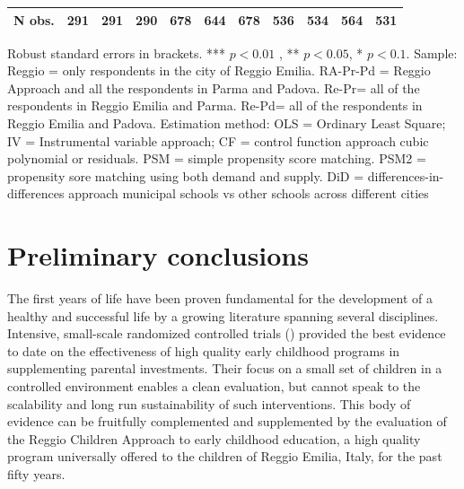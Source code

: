 \documentclass[12pt]{article}
\begin{document}
\begin{table}[ht]
\begin{center}
\begin{adjustbox}{width=1.2\textwidth,center=\textwidth}
\begin{tabular}{l*{10}{c}}
\hline
N obs. &  291 & 291 & 290 & 678 & 644 & 678 & 536 & 534 & 564 & 531 \\
\hline
\end{tabular}
\end{adjustbox}
\end{center}
\par
\vspace{1ex}
\par
{\footnotesize \raggedright{Robust standard errors in brackets. *** $p<0.01$%
, ** $p<0.05$, * $p<0.1$. Sample: Reggio = only respondents in the city of
Reggio Emilia. RA-Pr-Pd = Reggio Approach and all the respondents in Parma
and Padova. Re-Pr= all of the respondents in Reggio Emilia and Parma. Re-Pd=
all of the respondents in Reggio Emilia and Padova. Estimation method: OLS =
Ordinary Least Square; IV = Instrumental variable approach; CF = control
function approach cubic polynomial or residuals. PSM = simple propensity
score matching. PSM2 = propensity sore matching using both demand and
supply. DiD = differences-in-differences approach municipal schools vs other
schools across different cities} }
\end{table}


\section{Preliminary conclusions}

\label{sec:conclusion}

The first years of life have been proven fundamental for the development of
a healthy and successful life by a growing literature spanning several
disciplines. Intensive, small-scale randomized controlled trials (\cite%
{Heckman2013a,Campbell2014,Gertler2014}) provided the best evidence to date
on the effectiveness of high quality early childhood programs in
supplementing parental investments. Their focus on a small set of children
in a controlled environment enables a clean evaluation, but cannot speak to
the scalability and long run sustainability of such interventions. This body
of evidence can be fruitfully complemented and supplemented by the
evaluation of the Reggio Children Approach to early childhood education, a
high quality program universally offered to the children of Reggio Emilia,
Italy, for the past fifty years.
\end{document}
